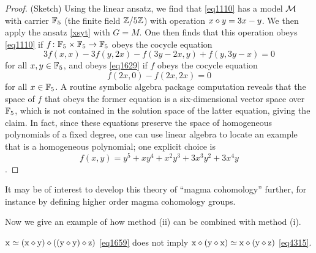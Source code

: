 \begin{proof}  (Sketch) Using the linear ansatz, we find that \eqref{eq1110} has a model ${\mathcal{M}}$ with carrier $\mathbb{F}_5$ (the finite field $\mathbb{Z}/5\mathbb{Z}$) with operation $x \diamond y = 3x-y$.  We then apply the ansatz \eqref{xsyt} with $G=M$.  One then finds that this operation obeys \eqref{eq1110} if $f \colon \mathbb{F}_5 \times \mathbb{F}_5 \to \mathbb{F}_5$ obeys the cocycle equation
  $$3f(x,x) - 3f(y,2x) - f(3y-2x,y) + f(y,3y-x) = 0$$
for all $x,y \in \mathbb{F}_5$, and obeys \eqref{eq1629} if $f$ obeys the cocycle equation
$$ f(2x,0) - f(2x,2x) = 0$$
for all $x \in \mathbb{F}_5$.  A routine symbolic algebra package computation reveals that the space of $f$ that obeys the former equation is a six-dimensional vector space over $\mathbb{F}_5$, which is not contained in the solution space of the latter equation, giving the claim.
In fact, since these equations preserve the space of homogeneous polynomials of a fixed degree, one can use linear algebra to locate an example that is a homogeneous polynomial; one explicit choice is $$f(x,y) = y^5 +xy^4 + x^2y^3 +3x^3 y^2 + 3x^4 y$$.
\end{proof}

It may be of interest to develop this theory of ``magma cohomology'' further, for instance by defining higher order magma cohomology groups.

Now we give an example of how method (ii) can be combined with method (i).

\begin{proposition}\label{1659-4315} $\mathrm{x} \simeq (\mathrm{x} \diamond \mathrm{y}) \diamond ((\mathrm{y} \diamond \mathrm{y}) \diamond \mathrm{z})$ \eqref{eq1659} does not imply $\mathrm{x} \diamond (\mathrm{y} \diamond \mathrm{x}) \simeq \mathrm{x} \diamond (\mathrm{y} \diamond \mathrm{z})$ \eqref{eq4315}.
\end{proposition}

